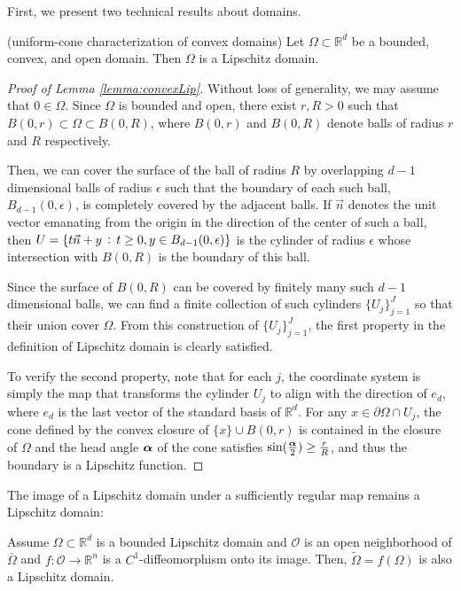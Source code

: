 First, we present two technical results about domains. 
\begin{lemma}\label{lemma:convexLip}
(uniform-cone
characterization of convex domains) 
  Let $\Omega\subset\mathbb{R}^d$ be a bounded, convex, and open
  domain. Then $\Omega$ is a Lipschitz domain.
\end{lemma}	
\begin{proof}[Proof of Lemma \ref{lemma:convexLip}]
  Without loss of generality, we may assume that $0\in\Omega$. Since
  $\Omega$ is bounded and open, there exist $r, R > 0$ such that
  $B(0,r)\subset \Omega\subset B(0,R)$, where $B(0,r)$ and $B(0,R)$
  denote balls of radius $r$ and $R$ respectively.

  Then, we can cover the surface of the ball of radius $R$ by overlapping
  $d-1$ dimensional balls of radius $\epsilon$ such that the boundary
  of each such ball, $B_{d-1}(0, \epsilon)$, is completely covered by
  the adjacent balls. If $\vec{n}$ denotes the unit vector emanating
  from the origin in the direction of the center of such a ball, then
  $U = \{t\vec{n} + y\, :\,t\geq 0, y\in B_{d-1}(0, \epsilon) \}$ is the
  cylinder of radius $\epsilon$ whose intersection with $B(0,R)$ is
  the boundary of this ball.

  Since the surface of $B(0, R)$ can be covered by finitely many such
  $d-1$ dimensional balls, we can find a finite collection of such
  cylinders $\{U_j\}_{j=1}^J$ so that their union cover $\Omega$. From
  this construction of $\{U_j\}_{j=1}^J$, the first property in the
  definition of Lipschitz domain is clearly satisfied.

  To verify the second property, note that for each $j$, the
  coordinate system is simply the map that transforms the cylinder
  $U_j$ to align with the direction of $e_d$, where $e_d$ is the last
  vector of the standard basis of $\mathbb{R}^d$. For any
  $x \in \partial\Omega\cap U_j$, the cone defined by the convex
  closure of $\{x\} \cup B(0,r)$ is contained in the closure of
  $\Omega$ and the head angle ${\boldsymbol \alpha}$ of the cone satisfies
  $\sin(\frac{{\boldsymbol \alpha}}{2}) \geq \frac{r}{R}$, and thus the boundary
  is a Lipschitz function.
\end{proof}	

The image of a Lipschitz domain under a sufficiently regular map
  remains a Lipschitz domain:
\begin{theorem}\label{thm:LipTransformation}
  Assume $\Omega \subset\mathbb{R}^d$ is a bounded Lipschitz
    domain and $\mathcal{O}$ is an open neighborhood of $\bar{\Omega}$ and
  $f:\mathcal{O}\rightarrow \mathbb{R}^n$ is a $C^1$-diffeomorphism
  onto its image. Then, $\tilde{\Omega} = f(\Omega)$ is also a
  Lipschitz domain.
\end{theorem}
	
